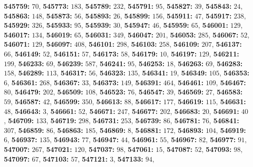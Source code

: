 \textsf{\bfseries 545759:} $70$, \textsf{\bfseries 545773:} $183$, \textsf{\bfseries 545789:} $232$, \textsf{\bfseries 545791:} $95$, \textsf{\bfseries 545827:} $39$, \textsf{\bfseries 545843:} $24$, \textsf{\bfseries 545863:} $148$, \textsf{\bfseries 545873:} $56$, \textsf{\bfseries 545893:} $26$, \textsf{\bfseries 545899:} $156$, \textsf{\bfseries 545911:} $47$, \textsf{\bfseries 545917:} $238$, \textsf{\bfseries 545929:} $326$, \textsf{\bfseries 545933:} $95$, \textsf{\bfseries 545939:} $30$, \textsf{\bfseries 545947:} $46$, \textsf{\bfseries 545959:} $65$, \textsf{\bfseries 546001:} $129$, \textsf{\bfseries 546017:} $134$, \textsf{\bfseries 546019:} $65$, \textsf{\bfseries 546031:} $349$, \textsf{\bfseries 546047:} $201$, \textsf{\bfseries 546053:} $285$, \textsf{\bfseries 546067:} $52$, \textsf{\bfseries 546071:} $129$, \textsf{\bfseries 546097:} $408$, \textsf{\bfseries 546101:} $298$, \textsf{\bfseries 546103:} $258$, \textsf{\bfseries 546109:} $207$, \textsf{\bfseries 546137:} $66$, \textsf{\bfseries 546149:} $52$, \textsf{\bfseries 546151:} $57$, \textsf{\bfseries 546173:} $58$, \textsf{\bfseries 546179:} $10$, \textsf{\bfseries 546197:} $129$, \textsf{\bfseries 546211:} $199$, \textsf{\bfseries 546233:} $69$, \textsf{\bfseries 546239:} $587$, \textsf{\bfseries 546241:} $95$, \textsf{\bfseries 546253:} $18$, \textsf{\bfseries 546263:} $69$, \textsf{\bfseries 546283:} $158$, \textsf{\bfseries 546289:} $113$, \textsf{\bfseries 546317:} $56$, \textsf{\bfseries 546323:} $135$, \textsf{\bfseries 546341:} $19$, \textsf{\bfseries 546349:} $105$, \textsf{\bfseries 546353:} $6$, \textsf{\bfseries 546361:} $268$, \textsf{\bfseries 546367:} $33$, \textsf{\bfseries 546373:} $149$, \textsf{\bfseries 546391:} $464$, \textsf{\bfseries 546461:} $109$, \textsf{\bfseries 546467:} $80$, \textsf{\bfseries 546479:} $202$, \textsf{\bfseries 546509:} $108$, \textsf{\bfseries 546523:} $76$, \textsf{\bfseries 546547:} $39$, \textsf{\bfseries 546569:} $27$, \textsf{\bfseries 546583:} $59$, \textsf{\bfseries 546587:} $42$, \textsf{\bfseries 546599:} $350$, \textsf{\bfseries 546613:} $88$, \textsf{\bfseries 546617:} $177$, \textsf{\bfseries 546619:} $115$, \textsf{\bfseries 546631:} $48$, \textsf{\bfseries 546643:} $3$, \textsf{\bfseries 546661:} $52$, \textsf{\bfseries 546671:} $247$, \textsf{\bfseries 546677:} $202$, \textsf{\bfseries 546683:} $20$, \textsf{\bfseries 546691:} $40$, \textsf{\bfseries 546709:} $133$, \textsf{\bfseries 546719:} $298$, \textsf{\bfseries 546731:} $253$, \textsf{\bfseries 546739:} $86$, \textsf{\bfseries 546781:} $76$, \textsf{\bfseries 546841:} $307$, \textsf{\bfseries 546859:} $86$, \textsf{\bfseries 546863:} $185$, \textsf{\bfseries 546869:} $8$, \textsf{\bfseries 546881:} $172$, \textsf{\bfseries 546893:} $104$, \textsf{\bfseries 546919:} $6$, \textsf{\bfseries 546937:} $135$, \textsf{\bfseries 546943:} $77$, \textsf{\bfseries 546947:} $44$, \textsf{\bfseries 546961:} $55$, \textsf{\bfseries 546967:} $82$, \textsf{\bfseries 546977:} $91$, \textsf{\bfseries 547007:} $267$, \textsf{\bfseries 547021:} $120$, \textsf{\bfseries 547037:} $98$, \textsf{\bfseries 547061:} $15$, \textsf{\bfseries 547087:} $52$, \textsf{\bfseries 547093:} $98$, \textsf{\bfseries 547097:} $67$, \textsf{\bfseries 547103:} $57$, \textsf{\bfseries 547121:} $3$, \textsf{\bfseries 547133:} $94$, 
